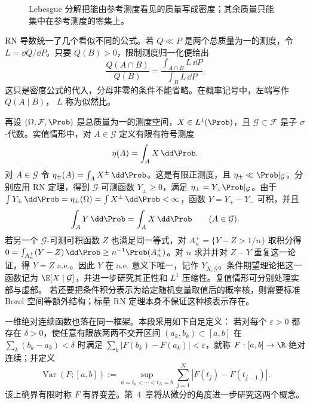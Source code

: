 \begin{figure}[htbp]
  \centering
  \caption{Lebesgue 分解把能由参考测度看见的质量写成密度；其余质量只能集中在参考测度的零集上。}
  \label{fig:3-3-1-lebesgue-decomposition}
\end{figure}

RN 导数统一了几个看似不同的公式。若 $Q\ll P$ 是两个总质量为一的测度，令
$L=\dd Q/\dd P$。只要 $Q(B)>0$，限制测度归一化便给出
\[
  \frac{Q(A\cap B)}{Q(B)}
  =\frac{\int_{A\cap B}L\,\dd P}{\int_BL\,\dd P}.
\]
这只是密度公式的代入，分母非零的条件不能省略。在概率记号中，左端写作 $Q(A\mid B)$，
$L$ 称为似然比。

再设 $(\Omega,\mathcal F,\Prob)$ 是总质量为一的测度空间，$X\in L^1(\Prob)$，且
$\mathcal G\subset\mathcal F$ 是子 $\sigma$-代数。实值情形中，对
$A\in\mathcal G$ 定义有限有符号测度
\[
  \eta(A)=\int_AX\,\dd\Prob.
\]
对 $A\in\mathcal G$ 令
$\eta_\pm(A)=\int_A X^\pm\,\dd\Prob$。这是有限正测度，且
$\eta_\pm\ll\Prob|_{\mathcal G}$。分别应用 RN 定理，得到 $\mathcal G$-可测函数
$Y_\pm\ge0$，满足 $\eta_\pm=Y_\pm\Prob|_{\mathcal G}$。由于
$\int Y_\pm\,\dd\Prob=\eta_\pm(\Omega)=\int X^\pm\,\dd\Prob<\infty$，函数
$Y=Y_+-Y_-$ 可积，并且
\[
  \int_AY\,\dd\Prob=\int_AX\,\dd\Prob
  \qquad(A\in\mathcal G).
\]
若另一个 $\mathcal G$-可测可积函数 $Z$ 也满足同一等式，对
$A_n^+=\{Y-Z>1/n\}$ 取积分得
$0=\int_{A_n^+}(Y-Z)\,\dd\Prob\ge n^{-1}\Prob(A_n^+)$。对 $n$ 求并并对
$Z-Y$ 重复这一论证，得 $Y=Z$ a.e.。因此 $Y$ 在 a.e. 意义下唯一，记作
$Y_{X,\mathcal G}$。条件期望理论把这一函数记为
$\E[X\mid\mathcal G]$，并进一步研究其正性和 $L^1$ 压缩性。复值情形可分别处理实部与虚部。
若还要把条件积分表示为给定随机变量取值后的概率核，则需要标准 Borel 空间等额外结构；标量
RN 定理本身不保证这种核表示存在。

一维绝对连续函数也落在同一框架。本段采用如下自足定义：
若对每个 $\varepsilon>0$ 都存在 $\delta>0$，使任意有限族两两不交开区间
$(a_k,b_k)\subset[a,b]$ 在 $\sum_k(b_k-a_k)<\delta$ 时满足
$\sum_k|F(b_k)-F(a_k)|<\varepsilon$，就称 $F:[a,b]\to\R$ 绝对连续；并定义
\[
 \operatorname{Var}(F;[a,b])
 :=\sup_{a=t_0<\cdots<t_N=b}\sum_{j=1}^N|F(t_j)-F(t_{j-1})|.
\]
该上确界有限时称 $F$ 有界变差。第~4~章将从微分的角度进一步研究这两个概念。

